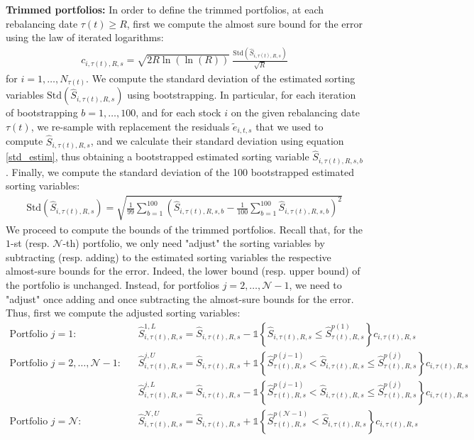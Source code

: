 \textbf{Trimmed portfolios:} In order to define the trimmed portfolios, at each rebalancing date $\tau(t) \geq R$, first we compute the almost sure bound for the error using the law of iterated logarithms:
\begin{align*}
c_{i,\tau(t),R,s} = \sqrt{2 R \ln \left( \ln \left(  R\right) \right)} \ \frac{\text{Std} \left( \widehat{S}_{i, \tau(t),R,s} \right)}{\sqrt{R}}
\end{align*}
for $i=1, \dots, N_{\tau(t)}$. We compute the standard deviation of the estimated sorting variables $\text{Std} \left( \widehat{S}_{i, \tau(t),R,s} \right)$ using bootstrapping. In particular, for each iteration of bootstrapping $b = 1, \dots, 100$, and for each stock $i$ on the given rebalancing date $\tau(t)$, we re-sample with replacement the residuals $\widetilde{e}_{i,t,s}$ that we used to compute $\widehat{S}_{i,\tau(t),R,s}$, and we calculate their standard deviation using equation \eqref{std_estim}, thus obtaining a bootstrapped estimated sorting variable $\widehat{S}_{i,\tau(t),R,s,b}$. Finally, we compute the standard deviation of the 100 bootstrapped estimated sorting variables:
\begin{align*}
\text{Std} \left( \widehat{S}_{i, \tau(t),R,s} \right) = \sqrt{ \frac{1}{99} \sum_{b=1}^{100} \left( \widehat{S}_{i,\tau(t),R,s,b} - \frac{1}{100} \sum_{b=1}^{100} \widehat{S}_{i,\tau(t),R,s,b} \right)^2 }
\end{align*}
We proceed to compute the bounds of the trimmed portfolios. Recall that, for the $1$-st (resp. $\mathcal{N}$-th) portfolio, we only need "adjust" the sorting variables by subtracting (resp. adding) to the estimated sorting variables the respective almost-sure bounds for the error. Indeed, the lower bound (resp. upper bound) of the portfolio is unchanged. Instead, for portfolios $j=2,\dots,\mathcal{N}-1$, we need to "adjust" once adding and once subtracting the almost-sure bounds for the error. Thus, first we compute the adjusted sorting variables:
\begin{align}
    \text{Portfolio $j=1$:} & \quad \widehat{S}_{i,\tau(t),R,s}^{1,L} = \widehat{S}_{i,\tau(t),R,s} - \mathds{1} \left\{ \widehat{S}_{i,\tau(t),R,s} \leq \widehat{S}_{\tau(t),R,s}^{p(1)} \right\} c_{i,\tau(t),R,s} \label{sims - bound trimmed bottom}\\
    \text{Portfolio $j=2,\dots,\mathcal{N}-1$:} & \quad \widehat{S}_{i,\tau(t),R,s}^{j,U} = \widehat{S}_{i,\tau(t),R,s} + \mathds{1} \left\{ \widehat{S}_{\tau(t),R,s}^{p(j-1)} <\widehat{S}_{i,\tau(t),R,s} \leq \widehat{S}_{\tau(t),R,s}^{p(j)} \right\} c_{i,\tau(t),R,s} \\
    & \quad \widehat{S}_{i,\tau(t),R,s}^{j,L} = \widehat{S}_{i,\tau(t),R,s} - \mathds{1} \left\{ \widehat{S}_{\tau(t),R,s}^{p(j-1)} < \widehat{S}_{i,\tau(t),R,s} \leq \widehat{S}_{\tau(t),R,s}^{p(j)} \right\} c_{i,\tau(t),R,s} \\
    \text{Portfolio $j=\mathcal{N}$:} & \quad \widehat{S}_{i,\tau(t),R,s}^{\mathcal{N},U} = \widehat{S}_{i,\tau(t),R,s} + \mathds{1} \left\{ \widehat{S}_{\tau(t),R,s}^{p(\mathcal{N}-1)} < \widehat{S}_{i,\tau(t),R,s} \right\} c_{i,\tau(t),R,s} \label{sims - conditions trimmed top}
\end{align}
